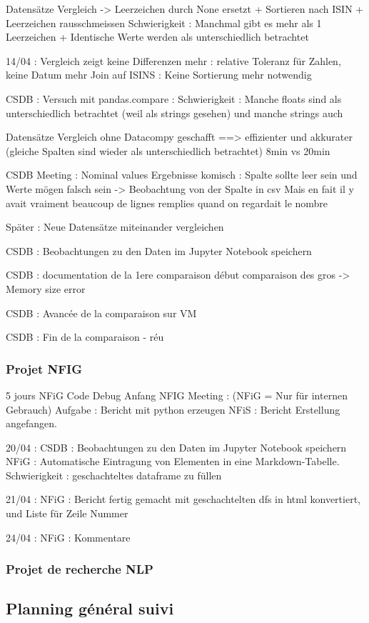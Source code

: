 Datensätze Vergleich -> Leerzeichen durch None ersetzt + Sortieren nach ISIN + Leerzeichen rausschmeissen
Schwierigkeit : Manchmal gibt es mehr als 1 Leerzeichen + Identische Werte werden als unterschiedlich betrachtet

14/04 : 
Vergleich zeigt keine Differenzen mehr : relative Toleranz für Zahlen, keine Datum mehr
Join auf ISINS : Keine Sortierung mehr notwendig

CSDB : Versuch mit pandas.compare : 
Schwierigkeit : Manche floats sind als unterschiedlich betrachtet (weil als strings gesehen) und manche strings auch

Datensätze Vergleich ohne Datacompy geschafft ==> effizienter und akkurater (gleiche Spalten sind wieder als unterschiedlich betrachtet)
8min vs 20min

CSDB Meeting : Nominal values Ergebnisse komisch : Spalte sollte leer sein und Werte mögen falsch sein -> Beobachtung von der Spalte in csv
Mais en fait il y avait vraiment beaucoup de lignes remplies quand on regardait le nombre

Später :
Neue Datensätze miteinander vergleichen

CSDB : Beobachtungen zu den Daten im Jupyter Notebook speichern

CSDB : documentation de la 1ere comparaison
début comparaison des gros -> Memory size error

CSDB : Avancée de la comparaison sur VM

CSDB : Fin de la comparaison - réu

\subsubsection{Projet NFIG}

5 jours
NFiG Code Debug Anfang
NFIG Meeting : (NFiG = Nur für internen Gebrauch)
Aufgabe : Bericht mit python erzeugen
NFiS : Bericht Erstellung angefangen. 

20/04 : 
CSDB : Beobachtungen zu den Daten im Jupyter Notebook speichern
NFiG : Automatische Eintragung von Elementen in eine Markdown-Tabelle. Schwierigkeit : geschachteltes dataframe zu füllen

21/04 : 
NFiG : Bericht fertig gemacht mit geschachtelten dfs in html konvertiert, und Liste für Zeile Nummer

24/04 : 
NFiG : Kommentare


\subsubsection{Projet de recherche NLP}

\subsection{Planning général suivi}